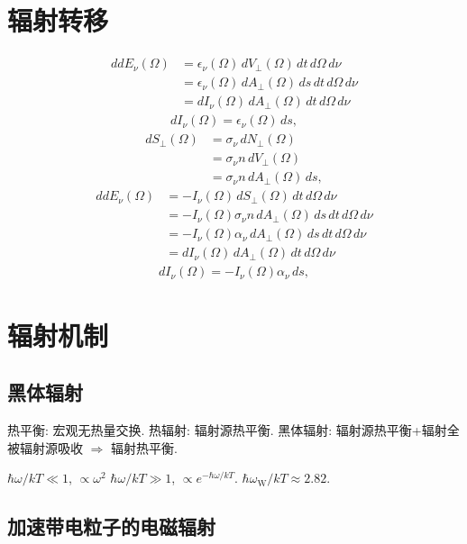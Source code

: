 \section{辐射转移}

\begin{align}
    ddE_\nu(\Omega)&=\epsilon_\nu(\Omega)\,dV_\perp(\Omega)\,dt\,d\Omega\,d\nu\\
    &=\epsilon_\nu(\Omega)\,dA_\perp(\Omega)\,ds\,dt\,d\Omega\,d\nu\\
    &=dI_\nu(\Omega)\,dA_\perp(\Omega)\,dt\,d\Omega\,d\nu
\end{align}
\begin{align}
    dI_\nu(\Omega)=\epsilon_\nu(\Omega)\,ds,
\end{align}
\begin{align}
    dS_\perp(\Omega)&=\sigma_\nu\,dN_\perp(\Omega)\\
    &=\sigma_\nu n\,dV_\perp(\Omega)\\
    &=\sigma_\nu n\,dA_\perp(\Omega)\,ds,
\end{align}
\begin{align}
    ddE_\nu(\Omega)&=-I_\nu(\Omega)\,dS_\perp(\Omega)\,dt\,d\Omega\,d\nu\\
    &=-I_\nu(\Omega)\sigma_\nu n\,dA_\perp(\Omega)\,ds\,dt\,d\Omega\,d\nu\\
    &=-I_\nu(\Omega)\alpha_\nu\,dA_\perp(\Omega)\,ds\,dt\,d\Omega\,d\nu\\
    &=dI_\nu(\Omega)\,dA_\perp(\Omega)\,dt\,d\Omega\,d\nu
\end{align}
\begin{align}
    dI_\nu(\Omega)=-I_\nu(\Omega)\alpha_\nu\,ds,
\end{align}

\section{辐射机制}

\subsection{黑体辐射}

热平衡: 宏观无热量交换. 热辐射: 辐射源热平衡. 黑体辐射: 辐射源热平衡+辐射全被辐射源吸收 $\Rightarrow$ 辐射热平衡.

$\hbar\omega/kT\ll 1$, $\propto\omega^2$ $\hbar\omega/kT\gg 1$, $\propto e^{-\hbar\omega/kT}$. $\hbar\omega_\text{W}/kT\approx2.82$.

\subsection{加速带电粒子的电磁辐射}

